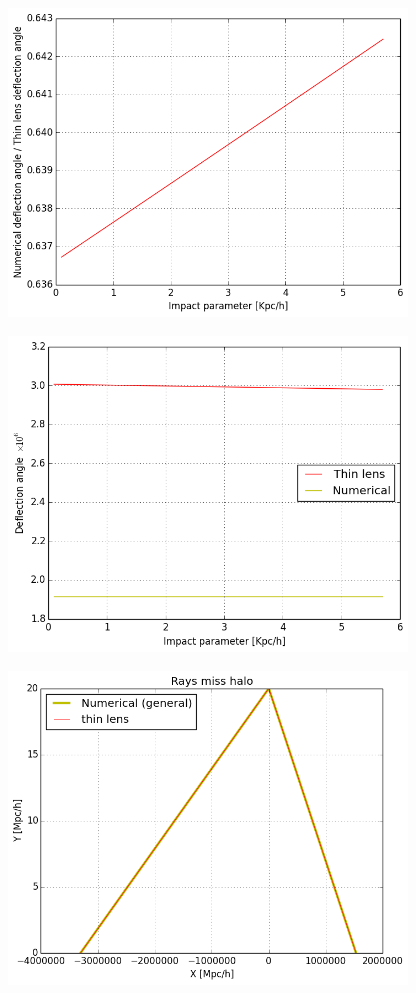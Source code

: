 \documentclass{article}
\begin{document}
\includegraphics[width=300pt]{u1.png}

\includegraphics[width=300pt]{u2.png} 

\includegraphics[width=300pt]{missing_the_lens.png} 
\end{document}
